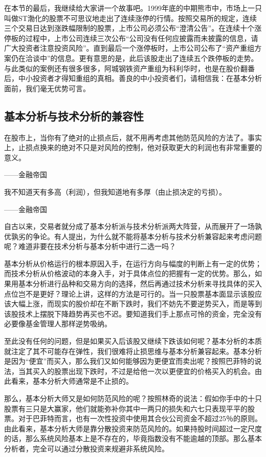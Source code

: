 在本节的最后，我继续给大家讲一个故事吧。1999年底的中期熊市中，市场上一只叫做ST渤化的股票不可思议地走出了连续涨停的行情。按照交易所的规定，连续三个交易日达到涨跌幅限制的股票，上市公司必须公布“澄清公告”。在连续十个涨停板的过程中，上市公司连续三次公布“公司没有任何应披露而未披露的信息，请广大投资者注意投资风险”。直到最后一个涨停板时，上市公司公布了“资产重组方案仍在洽谈中”的信息。更有意思的是，此后该股走出了连续五个跌停板的走势。与此类似的案例还有很多很多，阿城钢铁资产重组为科利华时，也是在股价翻番后，中小投资者才得知重组的真相。善良的中小投资者们，请相信我：在基本分析面前，我们毫无优势可言。

\subsection{基本分析与技术分析的兼容性}

{\kaishu
在股市上，当你有了绝对的止损点后，就不用再考虑其他防范风险的方法了。事实上，止损点换来的绝对不只是对风险的控制，他对获取更大的利润也有非常重要的意义。

\hfill ——金融帝国

我不知道天有多高（利润），但我知道地有多厚（由止损决定的亏损）。

\hfill ——金融帝国
}

自古以来，交易者就分成了基本分析派与技术分析派两大阵营，从而展开了一场孰优孰劣的争论。有人提出，为什么就不能将基本分析与技术分析兼容起来考虑问题呢？难道非要在技术分析与基本分析中进行二选一吗？

基本分析从价格运行的根本原因入手，在运行方向与幅度的判断上有一定的优势；而技术分析从价格波动的本身入手，对于具体点位的把握有一定的优势。那么，如果用基本分析进行品种和交易方向的选择，然后再通过技术分析来寻找具体的买入点位岂不是更好？理论上讲，这样的方法是可行的。当一只股票基本面显示该股应该大幅上涨，而现实的股价却在不断下跌时，我们不妨先不要逆势买入，而是等到该股技术上摆脱下降趋势再买也不迟。要知道我们手上那点可怜的资金，完全没有必要像基金管理人那样逆势吸纳。

至此没有任何的问题，但是如果买入后该股又继续下跌该如何呢？基本分析的本质就注定了其不可能存在弹性，我们很难将止损思维与基本分析兼容起来。基本分析是因为“便宜”而买入，那么我们又如何能够因为更便宜而卖出呢？按照巴菲特的说法，当其买入的股票出现下跌时，不过是给他一次以更便宜的价格买入的机会。由此看来，基本分析大师通常是不止损的。

那么，基本分析大师又是如何防范风险的呢？按照林奇的说法：假如你手中的十只股票有三只是大赢家，他们就能弥补你其中一两只的损失和六七只表现平平的股票。对于巴菲特而言，也有一次性投资中使用其合伙公司资金不超过25％的原则。由此看来，基本分析大师是靠分散投资来防范风险的。如果持股时间超过一定尺度的话，那么系统风险基本上是不存在的，毕竟指数没有不能逾越的顶部。那么基本分析者，完全可以通过分散投资来规避非系统风险。

